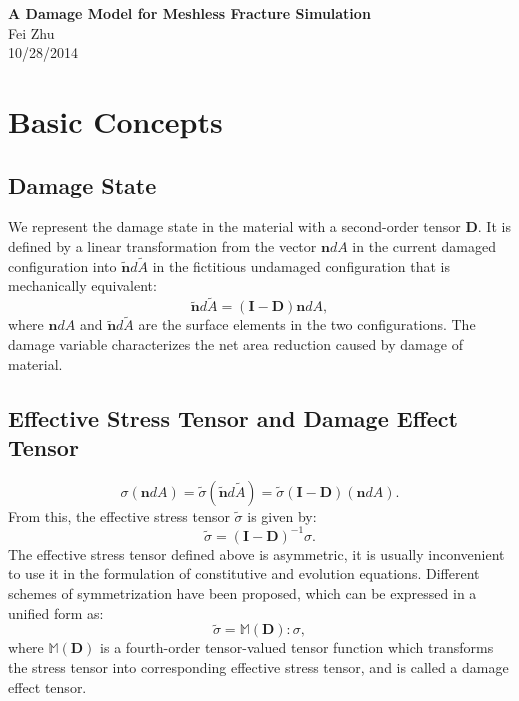 \documentclass[11pt,fullpage]{article}
\begin{document}
\noindent
\begin{center}
{\bf A Damage Model for Meshless Fracture Simulation}
{\\ Fei Zhu \\ 10/28/2014}
\end{center}

\section{Basic Concepts}

\subsection{Damage State}

We represent the damage state in the material with a second-order
tensor $\bm{D}$. It is defined by a linear transformation from the
vector $\bm{n}dA$ in the current damaged configuration into
$\tilde{\bm{n}}d\tilde{A}$ in the fictitious undamaged configuration
that is mechanically equivalent:
$$
\tilde{\bm{n}}d\tilde{A} = (\bm{I}-\bm{D})\bm{n}dA,
$$
where $\bm{n}dA$ and $\tilde{\bm{n}}d\tilde{A}$ are the surface
elements in the two configurations. The damage variable characterizes
the net area reduction caused by damage of material.

\subsection{Effective Stress Tensor and Damage Effect Tensor}

$$
\sigma(\bm{n}dA) = \tilde{\sigma}(\tilde{\bm{n}}d\tilde{A}) 
                 = \tilde{\sigma}(\bm{I}-\bm{D})(\bm{n}dA).
$$
From this, the effective stress tensor $\tilde{\sigma}$ is given by:
$$
\tilde{\sigma} = (\bm{I}-\bm{D})^{-1}\sigma.
$$
The effective stress tensor defined above is asymmetric, it is usually
inconvenient to use it in the formulation of constitutive and
evolution equations. Different schemes of symmetrization have been
proposed, which can be expressed in a unified form as:
$$
\tilde{\sigma} = \mathbb{M}(\bm{D}):\sigma,
$$
where $\mathbb{M}(\bm{D})$ is a fourth-order tensor-valued tensor
function which transforms the stress tensor into corresponding
effective stress tensor, and is called a damage effect tensor.
\end{document}
